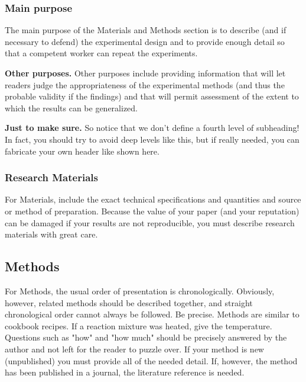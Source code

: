 \documentclass[a4paper]{article}
\begin{document}
\subsubsection{Main purpose}
The main purpose of the Materials and Methods section is to describe (and if
necessary to defend) the experimental design and to provide enough detail so that a competent worker
can repeat the experiments.
\par 
\vspace*{1ex} \noindent
\textbf{Other purposes.} Other purposes include providing information that will let readers judge
the appropriateness of the experimental methods (and thus the probable validity if the findings)
and that will permit assessment of the extent to which the results can be generalized.
\par 
\vspace*{1ex} \noindent
\textbf{Just to make sure.} So notice that we don't define a fourth level of subheading! In fact, you should try to avoid deep levels like this, but if really needed, you can fabricate your own header like shown here.

\subsubsection{Research Materials}
For Materials, include the exact technical specifications and quantities and source or method of preparation. Because the value of your paper (and your reputation) can be damaged if your results are not reproducible, you must describe research materials with great care.

\subsection{Methods}
For Methods, the usual order of presentation is chronologically. Obviously, however, related methods should be described together, and straight chronological order cannot always be followed.  Be precise. Methods are similar to cookbook recipes. If a reaction mixture was heated, give the temperature. Questions such as "how" and "how much" should be precisely answered by the author and not left for the reader to puzzle over. If your method is new (unpublished) you must provide all of the needed detail. If, however, the method has been published in a journal, the literature reference is needed.
\end{document}
